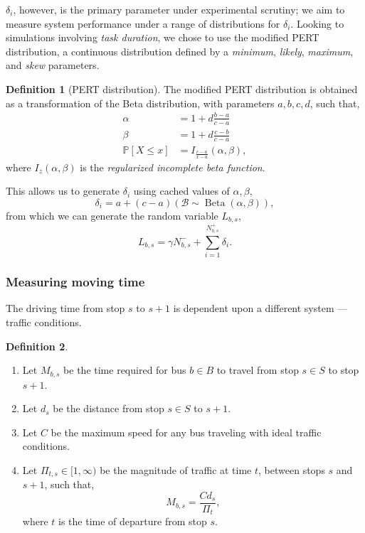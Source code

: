 \documentclass[12pt]{article}
\theoremstyle{definition}
\newtheorem{definition}{Definition}
\newcommand{\Prob}{\mathbb P}
\DeclareMathOperator{\Beta}{Beta}
\begin{document}
$\delta_i$, however, is the primary parameter under experimental scrutiny; we
aim to measure system performance under a range of distributions for
$\delta_i$. Looking to simulations involving \emph{task duration}, we chose to
use the modified PERT distribution, a continuous distribution defined by
a \emph{minimum}, \emph{likely}, \emph{maximum}, and \emph{skew}
parameters\cite{_pertDistribution_2023}.

\begin{definition}[PERT distribution]
    \hfill\par\nopagebreak
    The modified PERT distribution is obtained as a transformation of the Beta
    distribution, with parameters $a, b, c, d$, such that,
    \begin{align*}
        \alpha &= 1 + d \frac{b - a}{c - a}\\
        \beta &= 1 + d \frac{c - b}{c - a}\\
        \Prob[X \le x] &= I_{\frac{c - a}{x - a}}(\alpha, \beta),
    \end{align*}
    where $I_z(\alpha, \beta)$ is the \emph{regularized incomplete beta
    function}.
\end{definition}

This allows us to generate $\delta_i$ using cached values of $\alpha, \beta$,
\[
    \delta_i = a + (c - a)\left(\mathcal B \sim \Beta(\alpha, \beta)\right),
\]
from which we can generate the random variable $L_{b,s}$,
\[
    L_{b,s} = \gamma N^-_{b,s} + \sum_{i=1}^{N^+_{b,s}} \delta_i.
\]

\subsubsection{Measuring moving time}
\label{sec:moving-time}

The driving time from stop $s$ to $s+1$ is dependent upon a different system
--- traffic conditions.
\pagebreak[2]

\begin{definition}
    \hfill
    \begin{enumerate}
        \item Let $M_{b,s}$ be the time required for bus $b \in B$ to travel
            from stop $s \in S$ to stop $s+1$.
        \item Let $d_s$ be the distance from stop $s \in S$ to $s+1$.
        \item Let $C$ be the maximum speed for any bus traveling with ideal
            traffic conditions.
        \item Let $\Pi_{t,s} \in [1, \infty)$ be the magnitude of traffic at
            time $t$, between stops $s$ and $s+1$, such that,
            \[
                M_{b,s} = \frac{C d_s}{\Pi_t},
            \]
            where $t$ is the time of departure from stop $s$.
    \end{enumerate}
\end{definition}
\end{document}
